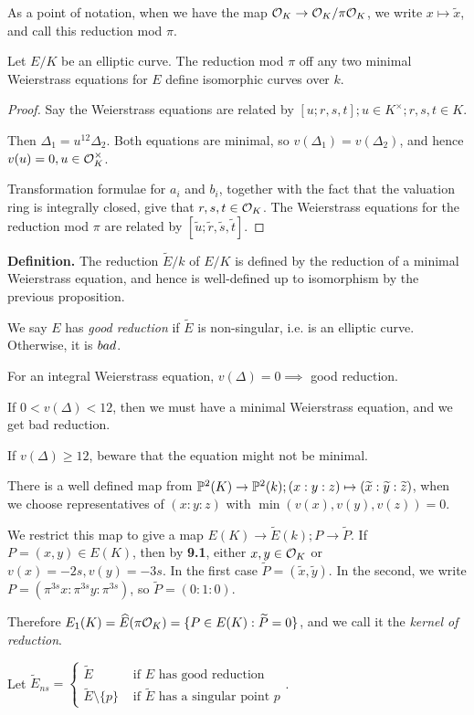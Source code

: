 \documentclass[10pt,a4paper]{article}
\begin{document}
As a point of notation, when we have the map $\O_K \to \O_K/\pi\O_K$, we write $x \mapsto \tilde{x}$, and call this reduction mod $\pi$.
\begin{proposition}
  Let $E/K$ be an elliptic curve. The reduction mod $\pi$ off any two minimal Weierstrass equations for $E$ define isomorphic curves over $k$.
\end{proposition}
\begin{proof}
  Say the Weierstrass equations are related by $[u; r,s,t]; u \in K^\times; r,s,t \in K$.

  Then $\Delta_1 = u^{12}\Delta_2$. Both equations are minimal, so $v(\Delta_1) = v(\Delta_2)$, and hence $v(u) = 0, u \in \O_K^\times$.

  Transformation formulae for $a_i$ and $b_i$, together with the fact that the valuation ring is integrally closed, give that $r, s, t \in \O_K$. The Weierstrass equations for the reduction mod $\pi$ are related by $[\tilde{u}; \tilde{r}, \tilde{s}, \tilde{t}]$.
\end{proof}
\textbf{Definition.} The reduction $\tilde{E}/k$ of $E/K$ is defined by the reduction of a minimal Weierstrass equation, and hence is well-defined up to isomorphism by the previous proposition.

We say $E$ has \emph{good reduction} if $\tilde{E}$ is non-singular, i.e. is an elliptic curve. Otherwise, it is $\emph{bad}$.

For an integral Weierstrass equation, $v(\Delta) = 0 \implies$ good reduction.

If $0 <v(\Delta) < 12$, then we must have a minimal Weierstrass equation, and we get bad reduction.

If $v(\Delta) \geq 12$, beware that the equation might not be minimal.

There is a well defined map from $\P^2(K) \to \P^2(k); (x:y:z)\mapsto (\tilde{x}:\tilde{y}:\tilde{z})$, when we choose representatives of $(x:y:z)$ with $\min(v(x),v(y),v(z)) = 0$.

We restrict this map to give a map $E(K) \to \tilde{E}(k); P \to \tilde{P}$. If $P=(x,y) \in E(K)$, then by \textbf{9.1}, either $x,y \in \O_K$ or $v(x) = -2s, v(y) = -3s$. In the first case $\tilde{P} = (\tilde{x}, \tilde{y})$. In the second, we write $P = (\pi^{3s}x:\pi^{3s}y :\pi^{3s})$, so $\tilde{P} = (0:1:0)$.

Therefore $E_1(K) = \hat{E}(\pi\O_K) = \{P \in E(K) : \tilde{P} = 0\}$, and we call it the \emph{kernel of reduction}.

Let $\tilde{E}_{ns} = \begin{cases} \tilde{E} &\text{ if $E$ has good reduction} \\ \tilde{E}\setminus\{p\} & \text{ if $\tilde{E}$ has a singular point $p$}\end{cases}$.
\end{document}
